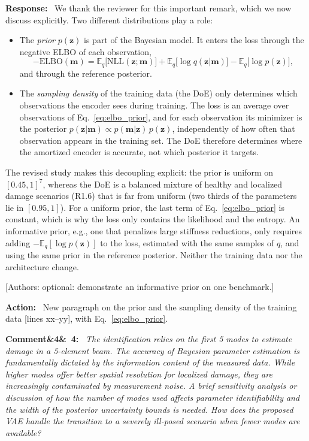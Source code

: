 \documentclass[11pt]{article}
\newenvironment{rcomment}[1]{\par\bigskip\noindent\textbf{Comment\ifx&#1&\else\ #1\fi:}\ \itshape}{\par}
\newenvironment{response}{\par\smallskip\noindent\color{resp}\textbf{Response:}\ }{\par}
\newenvironment{action}{\par\smallskip\noindent\color{resp}\textbf{Action:}\ }{\par}
\newcommand{\authornote}[1]{\textcolor{note}{\textsf{[Authors: #1]}}}
\newcommand{\tbd}[1]{\textcolor{note}{\textsf{[#1]}}}
\newcommand{\lines}[1]{\tbd{lines #1}}
\newcommand{\m}{\mathbf{m}}
\newcommand{\z}{\mathbf{z}}
\begin{document}
\begin{response}
We thank the reviewer for this important remark, which we now discuss explicitly. Two different distributions play a
role:
\begin{itemize}[leftmargin=*]
\item The \emph{prior} $p(\z)$ is part of the Bayesian model. It enters the loss through the negative ELBO of each
observation,
\begin{equation}
-\mathrm{ELBO}(\m)=\mathbb{E}_q\big[\mathrm{NLL}(\z;\m)\big]+\mathbb{E}_q\big[\log q(\z|\m)\big]
-\mathbb{E}_q\big[\log p(\z)\big],
\label{eq:elbo_prior}
\end{equation}
and through the reference posterior.
\item The \emph{sampling density} of the training data (the DoE) only determines which observations the encoder sees
during training. The loss is an average over observations of Eq.~\eqref{eq:elbo_prior}, and for each observation its
minimizer is the posterior $p(\z|\m)\propto p(\m|\z)\,p(\z)$, independently of how often that observation appears in the
training set. The DoE therefore determines where the amortized encoder is accurate, not which posterior it targets.
\end{itemize}
The revised study makes this decoupling explicit: the prior is uniform on $[0.45,1]^7$, whereas the DoE is a balanced
mixture of healthy and localized damage scenarios (R1.6) that is far from uniform (two thirds of the parameters lie in
$[0.95,1]$). For a uniform prior, the last term of Eq.~\eqref{eq:elbo_prior} is constant, which is why the loss only
contains the likelihood and the entropy. An informative prior, e.g., one that penalizes large stiffness reductions,
only requires adding $-\mathbb{E}_q[\log p(\z)]$ to the loss, estimated with the same samples of $q$, and using the same
prior in the reference posterior. Neither the training data nor the architecture change.
\end{response}
\authornote{optional: demonstrate an informative prior on one benchmark.}

\begin{action}
New paragraph on the prior and the sampling density of the training data \lines{xx--yy}, with
Eq.~\eqref{eq:elbo_prior}.
\end{action}

\begin{rcomment}{4}
The identification relies on the first 5 modes to estimate damage in a 5-element beam. The accuracy of Bayesian
parameter estimation is fundamentally dictated by the information content of the measured data. While higher modes
offer better spatial resolution for localized damage, they are increasingly contaminated by measurement noise. A brief
sensitivity analysis or discussion of how the number of modes used affects parameter identifiability and the width of
the posterior uncertainty bounds is needed. How does the proposed VAE handle the transition to a severely ill-posed
scenario when fewer modes are available?
\end{rcomment}
\end{document}
